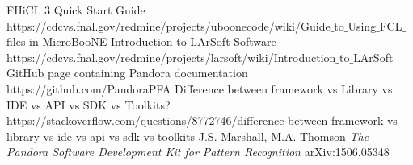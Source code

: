 \documentclass[9pt]{extreport}
\begin{document}
	\mainmatter
	
	
	
	
%	



	\backmatter
%
%
	\printindex %

  	\begin{thebibliography}{1}

	 FHiCL 3 Quick Start Guide https://cdcvs.fnal.gov/redmine/projects/uboonecode/wiki/Guide${\_}$to${\_}$Using${\_}$FCL${\_}$files${\_}$in${\_}$MicroBooNE 
	 Introduction to LArSoft Software https://cdcvs.fnal.gov/redmine/projects/larsoft/wiki/Introduction${\_}$to${\_}$LArSoft
	 GitHub page containing Pandora documentation https://github.com/PandoraPFA
	 Difference between framework vs Library vs IDE vs API vs SDK vs Toolkits? https://stackoverflow.com/questions/8772746/difference-between-framework-vs-library-vs-ide-vs-api-vs-sdk-vs-toolkits
	 J.S. Marshall, M.A. Thomson {\em The Pandora Software Development Kit for Pattern Recognition} arXiv:1506.05348
  	\end{thebibliography}

	\appendix
	

  	
\end{document}
